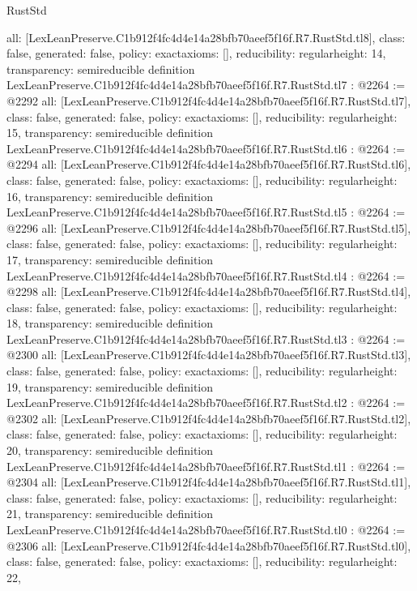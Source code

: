 \begin{lexlean}{RustStd}
\begin{coremodule}
{  all: [LexLeanPreserve.C1b912f4fc4d4e14a28bfb70aeef5f16f.R7.RustStd.tl8],
  class: false,
  generated: false,
  policy: exact{axioms: []},
  reducibility: regular{height: 14},
  transparency: semireducible
}
definition LexLeanPreserve.C1b912f4fc4d4e14a28bfb70aeef5f16f.R7.RustStd.tl7 : @2264 := @2292 {
  all: [LexLeanPreserve.C1b912f4fc4d4e14a28bfb70aeef5f16f.R7.RustStd.tl7],
  class: false,
  generated: false,
  policy: exact{axioms: []},
  reducibility: regular{height: 15},
  transparency: semireducible
}
definition LexLeanPreserve.C1b912f4fc4d4e14a28bfb70aeef5f16f.R7.RustStd.tl6 : @2264 := @2294 {
  all: [LexLeanPreserve.C1b912f4fc4d4e14a28bfb70aeef5f16f.R7.RustStd.tl6],
  class: false,
  generated: false,
  policy: exact{axioms: []},
  reducibility: regular{height: 16},
  transparency: semireducible
}
definition LexLeanPreserve.C1b912f4fc4d4e14a28bfb70aeef5f16f.R7.RustStd.tl5 : @2264 := @2296 {
  all: [LexLeanPreserve.C1b912f4fc4d4e14a28bfb70aeef5f16f.R7.RustStd.tl5],
  class: false,
  generated: false,
  policy: exact{axioms: []},
  reducibility: regular{height: 17},
  transparency: semireducible
}
definition LexLeanPreserve.C1b912f4fc4d4e14a28bfb70aeef5f16f.R7.RustStd.tl4 : @2264 := @2298 {
  all: [LexLeanPreserve.C1b912f4fc4d4e14a28bfb70aeef5f16f.R7.RustStd.tl4],
  class: false,
  generated: false,
  policy: exact{axioms: []},
  reducibility: regular{height: 18},
  transparency: semireducible
}
definition LexLeanPreserve.C1b912f4fc4d4e14a28bfb70aeef5f16f.R7.RustStd.tl3 : @2264 := @2300 {
  all: [LexLeanPreserve.C1b912f4fc4d4e14a28bfb70aeef5f16f.R7.RustStd.tl3],
  class: false,
  generated: false,
  policy: exact{axioms: []},
  reducibility: regular{height: 19},
  transparency: semireducible
}
definition LexLeanPreserve.C1b912f4fc4d4e14a28bfb70aeef5f16f.R7.RustStd.tl2 : @2264 := @2302 {
  all: [LexLeanPreserve.C1b912f4fc4d4e14a28bfb70aeef5f16f.R7.RustStd.tl2],
  class: false,
  generated: false,
  policy: exact{axioms: []},
  reducibility: regular{height: 20},
  transparency: semireducible
}
definition LexLeanPreserve.C1b912f4fc4d4e14a28bfb70aeef5f16f.R7.RustStd.tl1 : @2264 := @2304 {
  all: [LexLeanPreserve.C1b912f4fc4d4e14a28bfb70aeef5f16f.R7.RustStd.tl1],
  class: false,
  generated: false,
  policy: exact{axioms: []},
  reducibility: regular{height: 21},
  transparency: semireducible
}
definition LexLeanPreserve.C1b912f4fc4d4e14a28bfb70aeef5f16f.R7.RustStd.tl0 : @2264 := @2306 {
  all: [LexLeanPreserve.C1b912f4fc4d4e14a28bfb70aeef5f16f.R7.RustStd.tl0],
  class: false,
  generated: false,
  policy: exact{axioms: []},
  reducibility: regular{height: 22},
}
\end{coremodule}
\end{lexlean}
